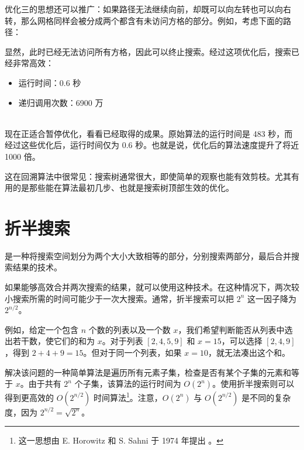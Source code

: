 优化三的思想还可以推广：如果路径无法继续向前，却既可以向左转也可以向右转，那么网格同样会被分成两个都含有未访问方格的部分。例如，考虑下面的路径：

\begin{center}
\end{center}
显然，此时已经无法访问所有方格，因此可以终止搜索。经过这项优化后，搜索已经非常高效：

\begin{itemize}
\item
运行时间：0.6 秒
\item
递归调用次数：6900 万
\end{itemize}

~\\
现在正适合暂停优化，看看已经取得的成果。原始算法的运行时间是 483 秒，而经过这些优化后，运行时间仅为 0.6 秒。也就是说，优化后的算法速度提升了将近 1000 倍。

这在回溯算法中很常见：搜索树通常很大，即使简单的观察也能有效剪枝。尤其有用的是那些能在算法最初几步、也就是搜索树顶部生效的优化。

\section{折半搜索}


是一种将搜索空间划分为两个大小大致相等的部分，分别搜索两部分，最后合并搜索结果的技术。

如果能够高效合并两次搜索的结果，就可以使用这种技术。在这种情况下，两次较小搜索所需的时间可能少于一次大搜索。通常，折半搜索可以把 $2^n$ 这一因子降为 $2^{n/2}$。

例如，给定一个包含 $n$ 个数的列表以及一个数 $x$，我们希望判断能否从列表中选出若干数，使它们的和为 $x$。对于列表 $[2,4,5,9]$ 和 $x=15$，可以选择 $[2,4,9]$，得到 $2+4+9=15$。但对于同一个列表，如果 $x=10$，就无法凑出这个和。

解决该问题的一种简单算法是遍历所有元素子集，检查是否有某个子集的元素和等于 $x$。由于共有 $2^n$ 个子集，该算法的运行时间为 $O(2^n)$。使用折半搜索则可以得到更高效的 $O(2^{n/2})$ 时间算法\footnote{这一思想由 E. Horowitz 和 S. Sahni 于 1974 年提出 \cite{hor74}。}。注意，$O(2^n)$ 与 $O(2^{n/2})$ 是不同的复杂度，因为 $2^{n/2}=\sqrt{2^n}$。

